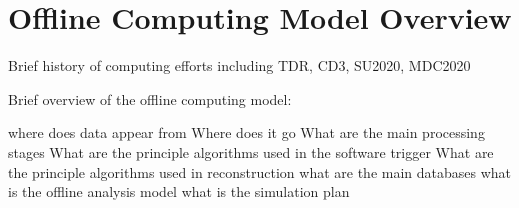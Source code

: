 \section{Offline Computing Model Overview}
\label{sec:overview}

Brief history of computing efforts including TDR, CD3, SU2020, MDC2020

Brief overview of the offline computing model:

where does data appear from
Where does it go
What are the main processing stages
What are the principle algorithms used in the software trigger
What are the principle algorithms used in reconstruction
what are the main databases
what is the offline analysis model
what is the simulation plan


